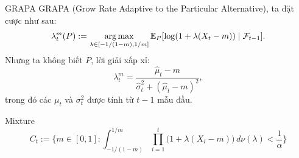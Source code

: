 \begin{frame}
  \begin{block}{GRAPA}
    GRAPA (Grow Rate Adaptive to the Particular Alternative), ta đặt cược như
    sau: \begin{equation}
      \lambda^m_t(P) := \mathop{\arg\max}_{\lambda \in [-1/(1 - m), 1/m]}
      \operatorname{\mathbb{E}}_P[\log(1 + \lambda(X_t - m)) \mid \mathcal{F}_{t - 1}].
    \end{equation} Nhưng ta không biết $P$, lời giải xấp xỉ: \begin{equation*}
      \lambda^m_t = \frac{\hat\mu_t - m}{ \hat\sigma_t^2 + (\hat\mu_t - m)^2 },
    \end{equation*} trong đó các $\mu_t$ và $\sigma_t^2$ được tính từ $t - 1$
    mẫu đầu.
  \end{block}

  \begin{block}{Mixture}
    \begin{equation}
      C_t := \Biggl\{ m \in [0,1] : \int_{-1/(1-m)}^{1/m} \prod_{i=1}^t \big(1
      + \lambda(X_i - m)\big) \, d\nu(\lambda) < \frac{1}{\alpha} \Biggr\}
    \end{equation}
  \end{block}
\end{frame}
